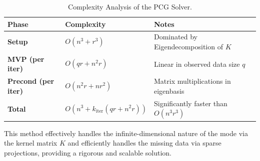 \documentclass[11pt]{article}
\begin{document}
\begin{table}[h]
\centering
\begin{tabular}{|l|l|l|}
\hline
\textbf{Phase} & \textbf{Complexity} & \textbf{Notes} \\ \hline
\textbf{Setup} & $O(n^3 + r^3)$ & Dominated by Eigendecomposition of $K$ \\ \hline
\textbf{MVP (per iter)} & $O(qr + n^2 r)$ & Linear in observed data size $q$ \\ \hline
\textbf{Precond (per iter)} & $O(n^2 r + nr^2)$ & Matrix multiplications in eigenbasis \\ \hline
\textbf{Total} & $O(n^3 + k_{\text{iter}}(qr + n^2r))$ & Significantly faster than $O(n^3 r^3)$ \\ \hline
\end{tabular}
\caption{Complexity Analysis of the PCG Solver.}
\end{table}

This method effectively handles the infinite-dimensional nature of the mode via the kernel matrix $K$ and efficiently handles the missing data via sparse projections, providing a rigorous and scalable solution.
\end{document}
